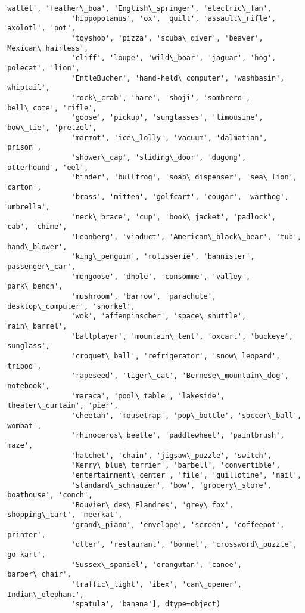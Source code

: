 \documentclass[11pt]{article}
\begin{document}
\begin{Verbatim}[commandchars=\\\{\}]
                'wallet', 'feather\_boa', 'English\_springer', 'electric\_fan',
                'hippopotamus', 'ox', 'quilt', 'assault\_rifle', 'axolotl', 'pot',
                'toyshop', 'pizza', 'scuba\_diver', 'beaver', 'Mexican\_hairless',
                'cliff', 'loupe', 'wild\_boar', 'jaguar', 'hog', 'polecat', 'lion',
                'EntleBucher', 'hand-held\_computer', 'washbasin', 'whiptail',
                'rock\_crab', 'hare', 'shoji', 'sombrero', 'bell\_cote', 'rifle',
                'goose', 'pickup', 'sunglasses', 'limousine', 'bow\_tie', 'pretzel',
                'marmot', 'ice\_lolly', 'vacuum', 'dalmatian', 'prison',
                'shower\_cap', 'sliding\_door', 'dugong', 'otterhound', 'eel',
                'binder', 'bullfrog', 'soap\_dispenser', 'sea\_lion', 'carton',
                'brass', 'mitten', 'golfcart', 'cougar', 'warthog', 'umbrella',
                'neck\_brace', 'cup', 'book\_jacket', 'padlock', 'cab', 'chime',
                'Leonberg', 'viaduct', 'American\_black\_bear', 'tub', 'hand\_blower',
                'king\_penguin', 'rotisserie', 'bannister', 'passenger\_car',
                'mongoose', 'dhole', 'consomme', 'valley', 'park\_bench',
                'mushroom', 'barrow', 'parachute', 'desktop\_computer', 'snorkel',
                'wok', 'affenpinscher', 'space\_shuttle', 'rain\_barrel',
                'ballplayer', 'mountain\_tent', 'oxcart', 'buckeye', 'sunglass',
                'croquet\_ball', 'refrigerator', 'snow\_leopard', 'tripod',
                'rapeseed', 'tiger\_cat', 'Bernese\_mountain\_dog', 'notebook',
                'maraca', 'pool\_table', 'lakeside', 'theater\_curtain', 'pier',
                'cheetah', 'mousetrap', 'pop\_bottle', 'soccer\_ball', 'wombat',
                'rhinoceros\_beetle', 'paddlewheel', 'paintbrush', 'maze',
                'hatchet', 'chain', 'jigsaw\_puzzle', 'switch',
                'Kerry\_blue\_terrier', 'barbell', 'convertible',
                'entertainment\_center', 'file', 'guillotine', 'nail',
                'standard\_schnauzer', 'bow', 'grocery\_store', 'boathouse', 'conch',
                'Bouvier\_des\_Flandres', 'grey\_fox', 'shopping\_cart', 'meerkat',
                'grand\_piano', 'envelope', 'screen', 'coffeepot', 'printer',
                'otter', 'restaurant', 'bonnet', 'crossword\_puzzle', 'go-kart',
                'Sussex\_spaniel', 'orangutan', 'canoe', 'barber\_chair',
                'traffic\_light', 'ibex', 'can\_opener', 'Indian\_elephant',
                'spatula', 'banana'], dtype=object)
\end{Verbatim}
            
\end{document}
